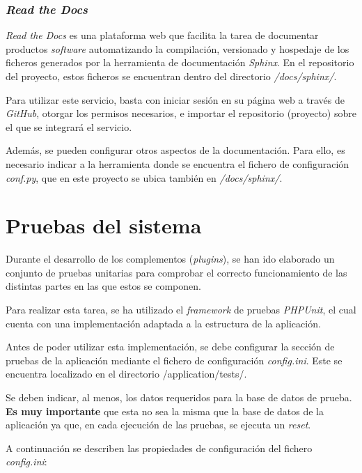 \subsubsection{\emph{Read the Docs}}

\emph{Read the Docs} es una plataforma web que facilita la tarea de
documentar productos \emph{software} automatizando la compilación,
versionado y hospedaje de los ficheros generados por la herramienta de
documentación \emph{Sphinx}. En el repositorio del proyecto, estos
ficheros se encuentran dentro del directorio \emph{/docs/sphinx/}.

Para utilizar este servicio, basta con iniciar sesión en su página web a
través de \emph{GitHub}, otorgar los permisos necesarios, e importar el
repositorio (proyecto) sobre el que se integrará el servicio.

Además, se pueden configurar otros aspectos de la documentación. Para
ello, es necesario indicar a la herramienta donde se encuentra el
fichero de configuración \emph{conf.py}, que en este proyecto se ubica
también en \emph{/docs/sphinx/}.


\section{Pruebas del sistema}

Durante el desarrollo de los complementos (\emph{plugins}), se han ido
elaborado un conjunto de pruebas unitarias para comprobar el correcto
funcionamiento de las distintas partes en las que estos se componen.

Para realizar esta tarea, se ha utilizado el \emph{framework} de pruebas
\emph{PHPUnit}, el cual cuenta con una implementación adaptada a la
estructura de la aplicación.

Antes de poder utilizar esta implementación, se debe configurar la
sección de pruebas de la aplicación mediante el fichero de configuración
\emph{config.ini}. Este se encuentra localizado en el directorio
{/application/tests/}.

Se deben indicar, al menos, los datos requeridos para la base de datos
de prueba. \textbf{Es muy importante} que esta no sea la misma que la
base de datos de la aplicación ya que, en cada ejecución de las pruebas,
se ejecuta un \emph{reset}.

A continuación se describen las propiedades de configuración del fichero
\emph{config.ini}:

